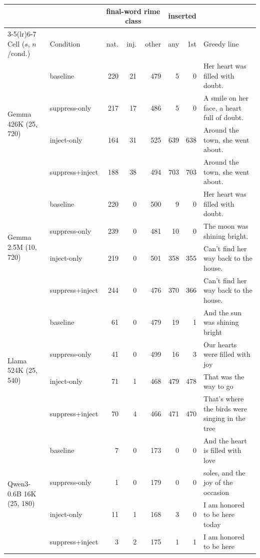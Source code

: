\documentclass[11pt]{article}
\begin{document}
\begin{table}[t]
\centering\footnotesize
\begin{tabular}{@{}llrrrrrp{4.6cm}@{}}
\toprule
 & & \multicolumn{3}{c}{final-word rime class} & \multicolumn{2}{c}{inserted} & \\
\cmidrule(lr){3-5}\cmidrule(lr){6-7}
Cell ($s$, $n$/cond.) & Condition & nat. & inj. & other & any & 1st & Greedy line \\
\midrule
\multirow{4}{*}{Gemma 426K (25, 720)} & baseline & 220 & 21 & 479 & 5 & 0 & Her heart was filled with doubt. \\
 & suppress-only & 217 & 17 & 486 & 5 & 0 & A smile on her face, a heart full of doubt. \\
 & inject-only & 164 & 31 & 525 & 639 & 638 & Around the town, she went about. \\
 & suppress+inject & 188 & 38 & 494 & 703 & 703 & Around the town, she went about. \\
\midrule
\multirow{4}{*}{Gemma 2.5M (10, 720)} & baseline & 220 & 0 & 500 & 9 & 0 & Her heart was filled with doubt. \\
 & suppress-only & 239 & 0 & 481 & 10 & 0 & The moon was shining bright. \\
 & inject-only & 219 & 0 & 501 & 358 & 355 & Can't find her way back to the house. \\
 & suppress+inject & 244 & 0 & 476 & 370 & 366 & Can't find her way back to the house. \\
\midrule
\multirow{4}{*}{Llama 524K (25, 540)} & baseline & 61 & 0 & 479 & 19 & 1 & And the sun was shining bright \\
 & suppress-only & 41 & 0 & 499 & 16 & 3 & Our hearts were filled with joy \\
 & inject-only & 71 & 1 & 468 & 479 & 478 & That was the way to go \\
 & suppress+inject & 70 & 4 & 466 & 471 & 470 & That's where the birds were singing in the tree \\
\midrule
\multirow{4}{*}{Qwen3-0.6B 16K (25, 180)} & baseline & 7 & 0 & 173 & 0 & 0 & And the heart is filled with love \\
 & suppress-only & 1 & 0 & 179 & 0 & 0 & soles, and the joy of the occasion \\
 & inject-only & 11 & 1 & 168 & 3 & 0 & I am honored to be here today \\
 & suppress+inject & 3 & 2 & 175 & 1 & 1 & I am honored to be here \\
\bottomrule
\end{tabular}

\end{table}
\end{document}
